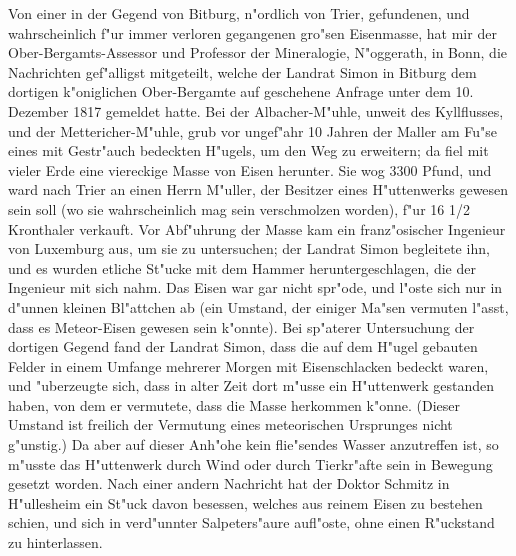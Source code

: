 \documentclass[a4paper, 11pt, oneside, polutonikogreek, german]{article}
\begin{document}
Von einer in der Gegend von Bitburg, n"ordlich von Trier, gefundenen, und wahrscheinlich f"ur immer verloren gegangenen gro"sen Eisenmasse, hat mir der Ober-Bergamts-Assessor und Professor der Mineralogie, N"oggerath, in Bonn, die Nachrichten gef"alligst mitgeteilt, welche der Landrat Simon in Bitburg dem dortigen k"oniglichen Ober-Bergamte auf geschehene Anfrage unter dem 10. Dezember 1817 gemeldet hatte. Bei der Albacher-M"uhle, unweit des Kyllflusses, und der Mettericher-M"uhle, grub vor ungef"ahr 10 Jahren der Maller am Fu"se eines mit Gestr"auch bedeckten H"ugels, um den Weg zu erweitern; da fiel mit vieler Erde eine viereckige Masse von Eisen herunter. Sie wog 3300 Pfund, und ward nach Trier an einen Herrn M"uller, der Besitzer eines H"uttenwerks gewesen sein soll (wo sie wahrscheinlich mag sein verschmolzen worden), f"ur 16 1/2 Kronthaler verkauft. Vor Abf"uhrung der Masse kam ein franz"osischer Ingenieur von Luxemburg aus, um sie zu untersuchen; der Landrat Simon begleitete ihn, und es wurden etliche St"ucke mit dem Hammer heruntergeschlagen, die der Ingenieur mit sich nahm. Das Eisen war gar nicht spr"ode, und l"oste sich nur in d"unnen kleinen Bl"attchen ab (ein Umstand, der einiger Ma"sen vermuten l"asst, dass es Meteor-Eisen gewesen sein k"onnte). Bei sp"aterer Untersuchung der dortigen Gegend fand der Landrat Simon, dass die auf dem H"ugel gebauten Felder in einem Umfange mehrerer Morgen mit Eisenschlacken bedeckt waren, und "uberzeugte sich, dass in alter Zeit dort m"usse ein H"uttenwerk gestanden haben, von dem er vermutete, dass die Masse herkommen k"onne. (Dieser Umstand ist freilich der Vermutung eines meteorischen Ursprunges nicht g"unstig.) Da aber auf dieser Anh"ohe kein flie"sendes Wasser anzutreffen ist, so m"usste das H"uttenwerk durch Wind oder durch Tierkr"afte sein in Bewegung gesetzt worden. Nach einer andern Nachricht hat der Doktor Schmitz in H"ullesheim ein St"uck davon besessen, welches aus reinem Eisen zu bestehen schien, und sich in verd"unnter Salpeters"aure aufl"oste, ohne einen R"uckstand zu hinterlassen.
\end{document}
